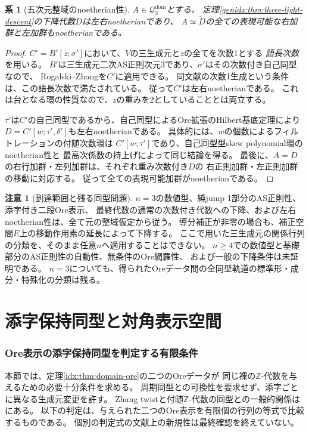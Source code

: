 \documentclass[11pt,a4paper]{ltjsarticle}
\newtheorem{corollary}[theorem]{系}
\theoremstyle{definition}
\newtheorem{remark}[theorem]{注意}
\begin{document}
\begin{corollary}[五次元整域のnoetherian性]
\label{genidx:cor:three-light-noetherian}
$A\in\mathcal Q_3^{\mathrm{dom}}$とする。
定理\ref{genidx:thm:three-light-descent}の下降代数$D$は左右noetherianであり、
$A\simeq\check D$の全ての表現可能な右加群と左加群もnoetherianである。
\end{corollary}
\begin{proof}
$C'=B'[z;\sigma']$において、$V$の三生成元と$z$の全てを次数1とする
\emph{語長次数}を用いる。
$B'$は三生成元二次AS正則次元3であり、$\sigma'$はその次数付き自己同型なので、
Rogalski--Zhang\cite[Lemma~1.3(a)]{RZ}を$C'$に適用できる。
同文献の次数1生成という条件は、この語長次数で満たされている。
従って$C'$は左右noetherianである。
これは台となる環の性質なので、$z$の重みを2としていることとは両立する。

$\tau'$は$C'$の自己同型であるから、自己同型によるOre拡張のHilbert基底定理により
$D=C'[w;\tau',\delta']$も左右noetherianである。
具体的には、$w$の個数によるフィルトレーションの付随次数環は
$C'[w;\tau']$であり、自己同型型skew polynomial環のnoetherian性と
最高次係数の持上げによって同じ結論を得る。
最後に、$A=\check D$の右行加群・左列加群は、それぞれ重み次数付き$D$の
右正則加群・左正則加群の移動に対応する。
従って全ての表現可能加群がnoetherianである。
\end{proof}

\begin{remark}[到達範囲と残る同型問題]
$n=3$の数値型、純jump 1部分のAS正則性、添字付き二段Ore表示、
最終代数の通常の次数付き代数への下降、および左右noetherian性は、全て元の整域仮定から従う。
導分補正が非零の場合も、補正空間$E$上の移動作用素の延長によって下降する。
ここで用いた三生成元の関係行列の分類を、そのまま任意$n$へ適用することはできない。
$n\geq4$での数値型と基礎部分のAS正則性の自動性、無条件のOre網羅性、
および一般の下降条件は未証明である。
$n=3$についても、得られたOreデータ間の全同型軌道の標準形・成分・特殊化の分類は残る。
\end{remark}



\clearpage
{}
\part{添字保持同型と対角表示空間}\label{part:isomorphism}
\section{Ore表示の添字保持同型を判定する有限条件}
\label{idx:sec:finite-isomorphism}
本節では、定理\ref{idx:thm:domain-ore}の二つのOreデータが
同じ裸の$\mathbb Z$-代数を与えるための必要十分条件を求める。
周期同型との可換性を要求せず、添字ごとに異なる生成元変更を許す。
Zhang twistと付随$\mathbb Z$-代数の同型との一般的関係は
\cite[Theorem 1.2, Corollary 4.4]{Sierra}にある。
以下の判定は、与えられた二つのOre表示を有限個の行列の等式で比較するものである。
個別の判定式の文献上の新規性は最終確認を終えていない。
\end{document}
